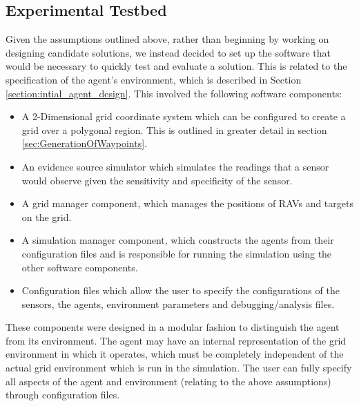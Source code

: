 \subsection{Experimental Testbed}
Given the assumptions outlined above, rather than beginning by working on designing candidate solutions, we instead decided to set up the software that would be necessary to quickly test and evaluate a solution. This is related to the specification of the agent's environment, which is described in Section \ref{section:intial_agent_design}. This involved the following software components:
\begin{itemize}
    \item A 2-Dimensional grid coordinate system which can be configured to create a grid over a polygonal region. This is outlined in greater detail in section \ref{sec:GenerationOfWaypoints}.
    \item An evidence source simulator which simulates the readings that a sensor would observe given the sensitivity and specificity of the sensor.
    \item A grid manager component, which manages the positions of RAVs and targets on the grid.
    \item A simulation manager component, which constructs the agents from their configuration files and is responsible for running the simulation using the other software components.
    \item Configuration files which allow the user to specify the configurations of the sensors, the agents, environment parameters and debugging/analysis files.
\end{itemize}
These components were designed in a modular fashion to distinguish the agent from its environment.%
 The agent may have an internal representation of the grid environment in which it operates, which must be completely independent of the actual grid environment which is run in the simulation. The user can fully specify all aspects of the agent and environment (relating to the above assumptions) through configuration files. 
